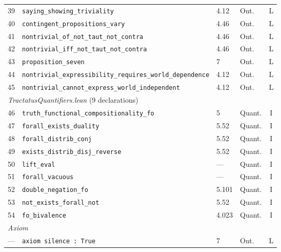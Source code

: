 \documentclass[10pt, letterpaper]{article}
\theoremstyle{definition}
\theoremstyle{remark}
\begin{document}
\begin{table}[p]
\begin{tabular}{@{}rlllc@{}}
39 & \texttt{saying\_showing\_triviality}                & 4.12    & Ont. & L \\
40 & \texttt{contingent\_propositions\_vary}             & 4.46    & Ont. & L \\
41 & \texttt{nontrivial\_of\_not\_taut\_not\_contra}     & 4.46    & Ont. & L \\
42 & \texttt{nontrivial\_iff\_not\_taut\_not\_contra}    & 4.46    & Ont. & L \\
43 & \texttt{proposition\_seven}                         & 7       & Ont. & L \\
44 & \texttt{nontrivial\_expressibility\_requires\_world\_dependence}
                                                         & 4.12    & Ont. & L \\
45 & \texttt{nontrivial\_cannot\_express\_world\_independent}
                                                         & 4.12    & Ont. & L \\
\midrule
\multicolumn{5}{l}{\emph{TractatusQuantifiers.lean} (9 declarations)} \\
\midrule
46 & \texttt{truth\_functional\_compositionality\_fo}    & 5       & Quant. & I \\
47 & \texttt{forall\_exists\_duality}                    & 5.52    & Quant. & I \\
48 & \texttt{forall\_distrib\_conj}                      & 5.52    & Quant. & I \\
49 & \texttt{exists\_distrib\_disj\_reverse}             & 5.52    & Quant. & I \\
50 & \texttt{lift\_eval}                                 & ---     & Quant. & I \\
51 & \texttt{forall\_vacuous}                            & ---     & Quant. & I \\
52 & \texttt{double\_negation\_fo}                       & 5.101   & Quant. & I \\
53 & \texttt{not\_exists\_forall\_not}                   & 5.52    & Quant. & I \\
54 & \texttt{fo\_bivalence}                              & 4.023   & Quant. & I \\
\midrule
\multicolumn{5}{l}{\emph{Axiom}} \\
\midrule
--- & \texttt{axiom silence : True}                      & 7       & Ont. & L \\
\bottomrule
\end{tabular}
\end{table}

\end{document}
